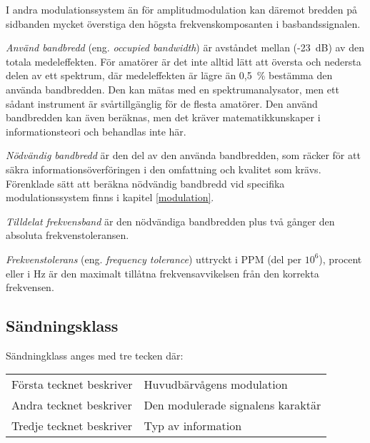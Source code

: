 I andra modulationssystem än för amplitudmodulation kan däremot bredden på
sidbanden mycket överstiga den högsta frekvenskomposanten i basbandssignalen.

\emph{Använd bandbredd} (eng. \emph{occupied bandwidth}) är avståndet mellan
(-23~dB) av den totala medeleffekten.
För amatörer är det inte alltid lätt att översta och nedersta delen av ett
spektrum, där medeleffekten är lägre än 0,5~\% bestämma den använda bandbredden.
Den kan mätas med en spektrumanalysator, men ett sådant instrument är
svårtillgänglig för de flesta amatörer.
Den använd bandbredden kan även beräknas, men det kräver matematikkunskaper i
informationsteori och behandlas inte här.

\emph{Nödvändig bandbredd} är den del av den använda bandbredden, som räcker
för att säkra informationsöverföringen i den omfattning och kvalitet som krävs.
Förenklade sätt att beräkna nödvändig bandbredd vid specifika modulationssystem
finns i kapitel \ref{modulation}.

\emph{Tilldelat frekvensband} är den nödvändiga bandbredden plus två gånger den
absoluta frekvenstoleransen.

\emph{Frekvenstolerans} (eng. \emph{frequency tolerance}) uttryckt i PPM (del per
\(10^6\)), procent eller i Hz är den maximalt tillåtna frekvensavvikelsen från
den korrekta frekvensen.

\subsection{Sändningsklass}
Sändningklass anges med tre tecken där:\\
\begin{tabular}{ll}
	Första tecknet beskriver &  Huvudbärvågens modulation \\
	Andra tecknet beskriver & Den modulerade signalens karaktär \\
	Tredje tecknet beskriver & Typ av information \\
\end{tabular}

